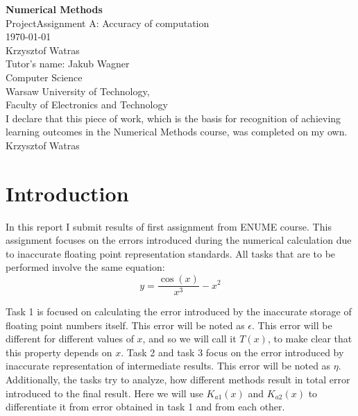 \documentclass[11pt]{article}
\begin{document}
\begin{titlepage}
   \begin{center}
       \vspace*{1cm}
       \textbf{\Huge Numerical Methods} \\
       \vspace{2.0cm}
       \huge{ProjectAssignment A: Accuracy of computation} \\
       \vspace{.7cm}
       \huge{\today} \\
       \vspace{3.0cm}
       \vspace{0.4cm}
       Krzysztof Watras\\
       \vspace{ 0.2cm }
       \small{ Tutor's name: Jakub Wagner } \\
       \vspace{2 cm}   
       \small{Computer Science} \\  
       \vspace{0.2cm}       
       \small{Warsaw University of Technology,\\
       Faculty of Electronics and Technology} \\
       \vspace{2cm}
       \small{I declare that this piece of work, which is the basis for
       recognition of achieving learning outcomes in the Numerical Methods
       course, was completed on my own. Krzysztof Watras} \\
   \end{center}
\end{titlepage} 
\tableofcontents

\newpage
\section{Introduction}
In this report I submit results of first assignment from ENUME course. This 
assignment focuses on the errors introduced during the numerical calculation
due to inaccurate floating point representation standards. All tasks that are
to be performed involve the same equation:
$$y = \frac{\cos(x)}{x^3} - x^2$$

Task 1 is focused on calculating the error introduced by the inaccurate storage
of floating point numbers itself. This error will be noted as $\epsilon$. This
error will be different for different values of $x$, and so we will call it
$T(x)$, to make clear that this property depends on $x$. Task 2 and task 3
focus on the error introduced by inaccurate representation of intermediate
results. This error will be noted as $\eta$.  Additionally, the tasks try to
analyze, how different methods result in total error introduced to the final
result. Here we will use $K_{a1}(x)$ and $K_{a2}(x)$ to differentiate it from
error obtained in task 1 and from each other.
\end{document}
